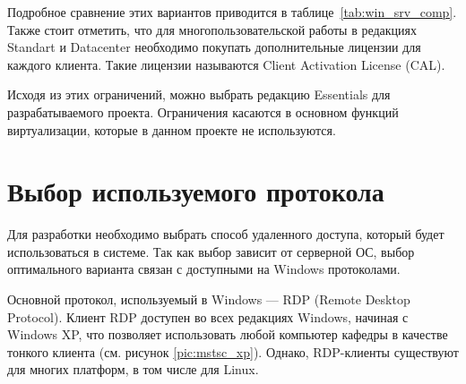 Подробное сравнение этих вариантов приводится в таблице~\ref{tab:win_srv_comp}.
Также стоит отметить, что для многопользовательской работы в редакциях Standart и
Datacenter необходимо покупать дополнительные лицензии для каждого клиента. Такие
лицензии называются Client Activation License (CAL).

Исходя из этих ограничений, можно выбрать редакцию Essentials для разрабатываемого
проекта. Ограничения касаются в основном функций виртуализации, которые в данном проекте
не используются.

\section{Выбор используемого протокола}

Для разработки необходимо выбрать способ удаленного доступа, который будет
использоваться в системе. Так как выбор зависит от серверной ОС, выбор оптимального
варианта связан с доступными на Windows протоколами.

Основной протокол, используемый в Windows — RDP (Remote Desktop Protocol). Клиент RDP
доступен во всех редакциях Windows, начиная с Windows XP, что позволяет использовать
любой компьютер кафедры в качестве тонкого клиента (см. рисунок \ref{pic:mstsc_xp}).
Однако, RDP-клиенты существуют для многих платформ, в том числе для Linux.


